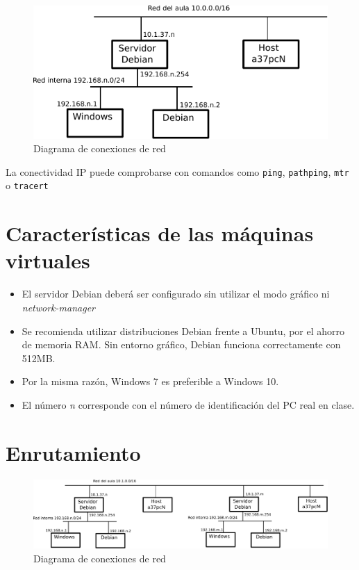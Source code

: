 \begin{figure}[h]
  \center\includegraphics{media/practica-red-ip.pdf}
  \caption{Diagrama de conexiones de red}
  \label{fig:redesip}
\end{figure}

La conectividad IP puede comprobarse con comandos como \texttt{ping}, \texttt{pathping}, \texttt{mtr} o \texttt{tracert}


\section{Características de las máquinas virtuales}
\begin{itemize}
\item El servidor Debian deberá ser configurado sin utilizar el modo gráfico ni \textit{network-manager}
\item Se recomienda utilizar distribuciones Debian frente a Ubuntu, por el ahorro de memoria RAM. Sin entorno gráfico, Debian funciona correctamente con 512MB.
\item Por la misma razón, Windows 7 es preferible a Windows 10.
  
\item El número \textit{n} corresponde con el número de identificación del PC real en clase.
\end{itemize}


\section{Enrutamiento}
\begin{figure}[h]
  \center\includegraphics[width=\textwidth]{media/practica-enrutamiento-ip.pdf}
  \caption{Diagrama de conexiones de red}
  \label{fig:redesip}
\end{figure}

